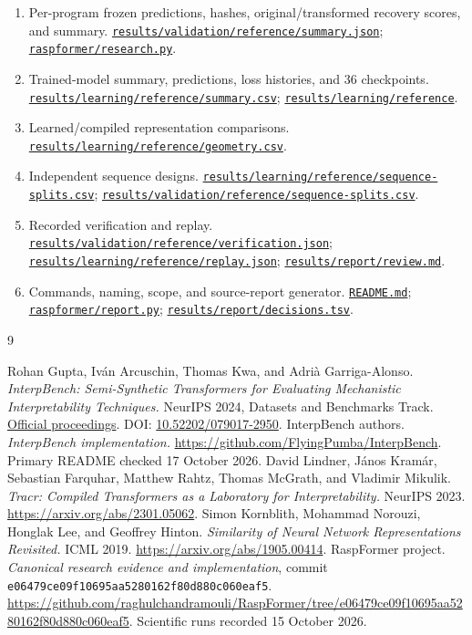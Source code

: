 \documentclass[10pt,a4paper]{article}
\newcommand{\repopath}[1]{\href{https://github.com/raghulchandramouli/RaspFormer/blob/e06479ce09f10695aa5280162f80d880c060eaf5/#1}{\nolinkurl{#1}}}
\newcommand{\repodir}[1]{\href{https://github.com/raghulchandramouli/RaspFormer/tree/e06479ce09f10695aa5280162f80d880c060eaf5/#1}{\nolinkurl{#1}}}
\begin{document}
\begin{enumerate}[label=E\arabic*.,ref=E\arabic*,itemsep=7pt]
\item\label{src:recovery} Per-program frozen predictions, hashes, original/transformed recovery scores, and summary. \repopath{results/validation/reference/summary.json}; \repopath{raspformer/research.py}.
\item\label{src:learning} Trained-model summary, predictions, loss histories, and 36 checkpoints. \repopath{results/learning/reference/summary.csv}; \repodir{results/learning/reference}.
\item\label{src:learnedgeometry} Learned/compiled representation comparisons. \repopath{results/learning/reference/geometry.csv}.
\item\label{src:splits} Independent sequence designs. \repopath{results/learning/reference/sequence-splits.csv}; \repopath{results/validation/reference/sequence-splits.csv}.
\item\label{src:verification} Recorded verification and replay. \repopath{results/validation/reference/verification.json}; \repopath{results/learning/reference/replay.json}; \repopath{results/report/review.md}.
\item\label{src:readme} Commands, naming, scope, and source-report generator. \repopath{README.md}; \repopath{raspformer/report.py}; \repopath{results/report/decisions.tsv}.
\end{enumerate}
\endgroup

\clearpage
{}
\begin{thebibliography}{9}
\raggedright
{} Rohan Gupta, Iv\'an Arcuschin, Thomas Kwa, and Adri\`a Garriga-Alonso. \emph{InterpBench: Semi-Synthetic Transformers for Evaluating Mechanistic Interpretability Techniques.} NeurIPS 2024, Datasets and Benchmarks Track. \href{https://proceedings.neurips.cc/paper_files/paper/2024/hash/a8f7d43ae092d9a5295775eb17f3f4f7-Abstract-Datasets_and_Benchmarks_Track.html}{Official proceedings}. DOI: \href{https://doi.org/10.52202/079017-2950}{10.52202/079017-2950}.
 InterpBench authors. \emph{InterpBench implementation.} \url{https://github.com/FlyingPumba/InterpBench}. Primary README checked 17 October 2026.
 David Lindner, J\'anos Kram\'ar, Sebastian Farquhar, Matthew Rahtz, Thomas McGrath, and Vladimir Mikulik. \emph{Tracr: Compiled Transformers as a Laboratory for Interpretability.} NeurIPS 2023. \url{https://arxiv.org/abs/2301.05062}.
 Simon Kornblith, Mohammad Norouzi, Honglak Lee, and Geoffrey Hinton. \emph{Similarity of Neural Network Representations Revisited.} ICML 2019. \url{https://arxiv.org/abs/1905.00414}.
 RaspFormer project. \emph{Canonical research evidence and implementation}, commit \texttt{e06479ce09f10695aa5280162f80d880c060eaf5}. \url{https://github.com/raghulchandramouli/RaspFormer/tree/e06479ce09f10695aa5280162f80d880c060eaf5}. Scientific runs recorded 15 October 2026.
\end{thebibliography}
\end{document}
